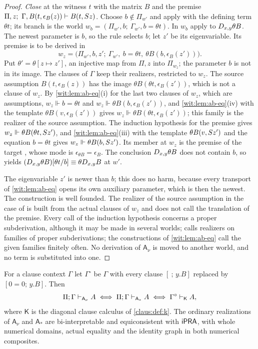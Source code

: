 \begin{proof}
\emph{Close} at the witness $t$ with the matrix $B$ and the premise
$\Pi,z;\ \Gamma,B(t,\epsilon_B(z))\proves B(t,\Suc z)$.  Choose
$b\notin\Pi_{w'}$ and apply  with the defining term
$\theta t$; its branch is the world
$w_b=(\Pi_{w'},b;\ \Gamma_{w'},b=\theta t)$.  In $w_b$ apply
 to $D_{x,y}\theta B$.  The newest parameter is $b$, so the
rule selects $b$; let $z'$ be its eigenvariable.  Its premise is to be
derived in
\[
 w_z=\bigl(\Pi_{w'},b,z';\ \Gamma_{w'},\ b=\theta t,\
 \theta B(b,\epsilon_B(z'))\bigr).
\]
Put $\theta'=\theta[z\mapsto z']$, an injective map from $\Pi,z$ into
$\Pi_{w_z}$; the parameter $b$ is not in its image.  The clauses of
$\Gamma$ keep their realizers, restricted to $w_z$.  The source assumption
$B(t,\epsilon_B(z))$ has the image $\theta B(\theta t,\epsilon_B(z'))$,
which is not a clause of $w_z$.  By \cref{wit:lem:ab-eq}(i) for the last
two clauses of $w_z$, which are assumptions,
$w_z\Vdash b=\theta t$ and $w_z\Vdash\theta B(b,\epsilon_B(z'))$, and
\cref{wit:lem:ab-eq}(iv) with the template $\theta B(v,\epsilon_B(z'))$
gives $w_z\Vdash\theta B(\theta t,\epsilon_B(z'))$; this family is the
realizer of the source assumption.  The induction hypothesis for the
premise gives $w_z\Vdash\theta B(\theta t,S z')$, and
\cref{wit:lem:ab-eq}(iii) with the template $\theta B(v,S z')$ and the
equation $b=\theta t$ gives $w_z\Vdash\theta B(b,S z')$.  Its member at
$w_z$ is the premise of the target \rulename{Close}, whose mode is
$\epsilon_{\theta B}=\epsilon_B$.  The conclusion $D_{x,y}\theta B$ does not
contain $b$, so \rulename{Alias} yields
$(D_{x,y}\theta B)[\theta t/b]\equiv\theta D_{x,y}B$ at $w'$.

The eigenvariable $z'$ is newer than $b$; this does no harm, because every
transport of \cref{wit:lem:ab-eq} opens its own auxiliary parameter, which
is then the newest.  The construction is well founded.  The realizer of the
source assumption in the case of \rulename{Close} is built from the actual
clauses of $w_z$ and does not call the translation of the premise.  Every
call of the induction hypothesis concerns a proper subderivation, although
it may be made in several worlds; \rulename{Use} calls realizers on
families of proper subderivations; the constructions of
\cref{wit:lem:ab-eq} call the given families finitely often.  No derivation
of $\mathsf{A}_{\nu}$ is moved to another world, and no term is substituted
into one.
\end{proof}

\begin{corollary}
\label{wit:cor:ab-bridge}
For a clause context $\Gamma$ let $\Gamma^{\circ}$ be $\Gamma$ with every
clause $[\ ;\,y.B]$ replaced by $[0=0;\,y.B]$.  Then
\[
 \Pi;\Gamma\vdash_{\mathsf{A}_{\nu}}A
 \iff \Pi;\Gamma\vdash_{\mathsf{A}_{\ast}}A
 \iff \Gamma^{\circ}\vdash_{\mathsf{K}}A ,
\]
where $\mathsf{K}$ is the diagonal clause calculus of \cref{claus:def:k}.
The ordinary realizations of $\mathsf{A}_{\nu}$ and $\mathsf{A}_{\ast}$ are
bi-interpretable and equiconsistent with $\mathsf{iPRA}$, with whole numerical
domains, actual equality and the identity graph in both numerical
composites.
\end{corollary}

